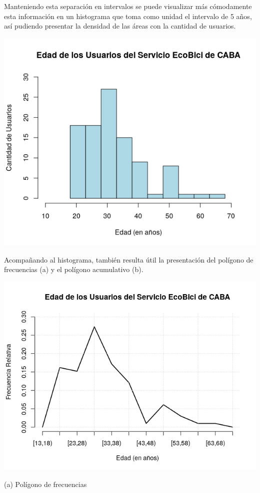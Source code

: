 \documentclass[11pt]{article}
\begin{document}
    Manteniendo esta separaci\'on en intervalos se puede visualizar m\'as c\'omodamente esta informaci\'on en un histograma
    que toma como unidad el intervalo de 5 a\~{n}os, as\'i pudiendo presentar la densidad de las \'areas con
    la cantidad de usuarios.

    \hspace{7mm}\includegraphics[scale=0.7]{HistEdad.png}

    Acompañando al histograma, tambi\'en resulta \'util la presentaci\'on del pol\'igono de frecuencias (a) y el pol\'igono acumulativo (b).

    \begin{center}
    \includegraphics[scale=0.55]{PoligFrecEdad.png}
    \vspace{-4mm}

    (a) Pol\'igono de frecuencias
    \end{center}
\end{document}
